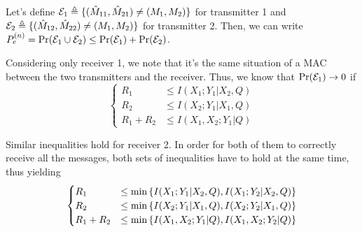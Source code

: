 
Let's define $\mathcal{E}_1 \triangleq \{ (\hat{M}_{11},\hat{M}_{21}) \neq (M_1,M_2) \}$ for transmitter 1 and $\mathcal{E}_2 \triangleq \{ (\hat{M}_{12},\hat{M}_{22}) \neq (M_1,M_2) \}$ for transmitter 2. Then, we can write $ P_e^{(n)}  = \Pr(\mathcal{E}_1 \cup \mathcal{E}_2) \leq \Pr(\mathcal{E}_1) + \Pr(\mathcal{E}_2)$.

Considering only receiver 1, we note that it's the same situation of a MAC between the two transmitters and the receiver. Thus, we know that $\Pr(\mathcal{E}_1) \rightarrow 0$ if
%
\begin{equation}
\begin{cases}
	R_1 &\leq I(X_1;Y_1|X_2,Q)\\
	R_2 &\leq I(X_2;Y_1|X_1,Q)\\
	R_1+R_2 &\leq I(X_1,X_2;Y_1|Q)
\end{cases}
\end{equation}

Similar inequalities hold for receiver 2. In order for both of them to correctly receive all the messages, both sets of inequalities have to hold at the same time, thus yielding
%
\begin{equation}
\begin{cases}
	R_1 &\leq \min \qty{ I(X_1;Y_1|X_2,Q),I(X_1;Y_2|X_2,Q) }\\
	R_2 &\leq \min \qty{ I(X_2;Y_1|X_1,Q),I(X_2;Y_2|X_1,Q) }\\
	R_1+R_2 &\leq \min \qty{ I(X_1,X_2;Y_1|Q),I(X_1,X_2;Y_2|Q) }
\end{cases}
\end{equation}